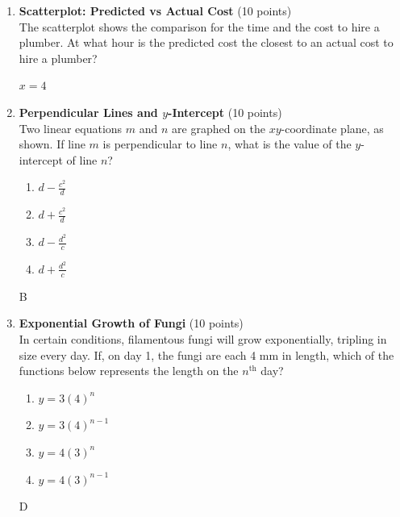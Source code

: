 \begin{enumerate}
  \item \textbf{Scatterplot: Predicted vs Actual Cost} (10 points)\\
  The scatterplot shows the comparison for the time and the cost to hire a plumber. At what hour is the predicted cost the closest to an actual cost to hire a plumber?
  \begin{subanswer}
    $x=4$
  \end{subanswer}




  \newpage


  \item \textbf{Perpendicular Lines and $y$-Intercept} (10 points)\\
  Two linear equations $m$ and $n$ are graphed on the $xy$-coordinate plane, as shown. If line $m$ is perpendicular to line $n$, what is the value of the $y$-intercept of line $n$?
  \begin{enumerate}[label=(\Alph*)]
    \item $d-\frac{c^2}{d}$
    \item $d+\frac{c^2}{d}$
    \item $d-\frac{d^2}{c}$
    \item $d+\frac{d^2}{c}$
  \end{enumerate}
  \begin{subanswer}
    B
  \end{subanswer}

  \item \textbf{Exponential Growth of Fungi} (10 points)\\
  In certain conditions, filamentous fungi will grow exponentially, tripling in size every day. If, on day 1, the fungi are each 4 mm in length, which of the functions below represents the length on the $n^{\text{th}}$ day?
  \begin{enumerate}[label=(\Alph*)]
    \item $y=3(4)^n$
    \item $y=3(4)^{n-1}$
    \item $y=4(3)^n$
    \item $y=4(3)^{n-1}$
  \end{enumerate}
  \begin{subanswer}
    D
  \end{subanswer}




\end{enumerate}
